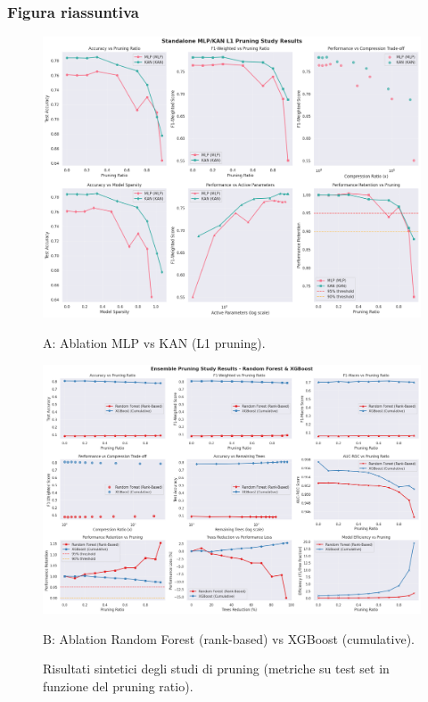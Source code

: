 \documentclass[a4paper,12pt]{report}
\begin{document}
	\subsubsection{Figura riassuntiva}
	\begin{figure}[htbp]
		\centering
		\begin{minipage}{0.49\textwidth}
			\centering
			\includegraphics[width=\linewidth]{img/abl_kanvsmlp_pm.png}
			\caption*{A: Ablation MLP vs KAN (L1 pruning).}
		\end{minipage}\hfill
		\begin{minipage}{0.49\textwidth}
			\centering
			\includegraphics[width=\linewidth]{img/abl_xgbvsrf_pm.png}
			\caption*{B: Ablation Random Forest (rank-based) vs XGBoost (cumulative).}
		\end{minipage}
		\caption{Risultati sintetici degli studi di pruning (metriche su test set in funzione del pruning ratio).}
	\end{figure}
	
\end{document}
